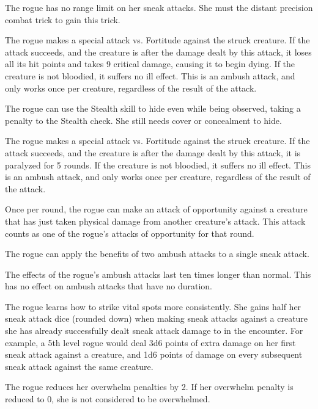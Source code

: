  The rogue has no range limit on her sneak attacks. She must the distant precision combat trick to gain this trick.

 The rogue makes a special attack vs. Fortitude against the struck creature. If the attack succeeds, and the creature is \bloodied after the damage dealt by this attack, it loses all its hit points and takes 9 critical damage, causing it to begin dying. If the creature is not bloodied, it suffers no ill effect. This is an ambush attack, and only works once per creature, regardless of the result of the attack.

 The rogue can use the Stealth skill to hide even while being observed, taking a  penalty to the Stealth check. She still needs cover or concealment to hide.

 The rogue makes a special attack vs. Fortitude against the struck creature. If the attack succeeds, and the creature is \bloodied after the damage dealt by this attack, it is paralyzed for 5 rounds. If the creature is not bloodied, it suffers no ill effect. This is an ambush attack, and only works once per creature, regardless of the result of the attack.

 Once per round, the rogue can make an attack of opportunity against a creature that has just taken physical damage from another creature's attack. This attack counts as one of the rogue's attacks of opportunity for that round.

 The rogue can apply the benefits of two ambush attacks to a single sneak attack.

 The effects of the rogue's ambush attacks last ten times longer than normal. This has no effect on ambush attacks that have no duration.

 The rogue learns how to strike vital spots more consistently. She gains half her sneak attack dice (rounded down) when making sneak attacks against a creature she has already successfully dealt sneak attack damage to in the encounter. For example, a 5th level rogue would deal 3d6 points of extra damage on her first sneak attack against a creature, and 1d6 points of damage on every subsequent sneak attack against the same creature.

  The rogue reduces her overwhelm penalties by 2. If her overwhelm penalty is reduced to 0, she is not considered to be overwhelmed.

